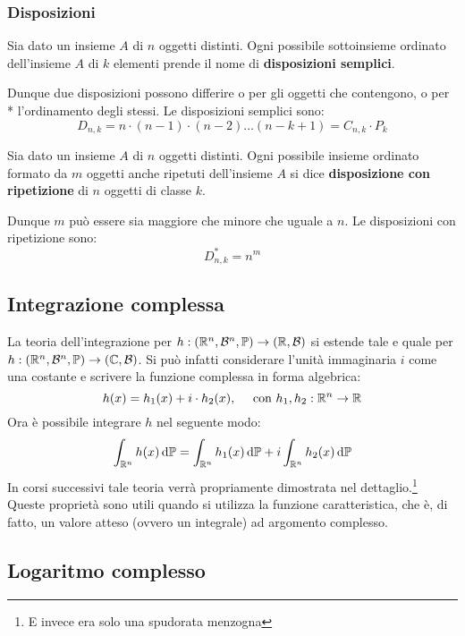 \subsubsection{Disposizioni}

\begin{defn}
	Sia dato un insieme $A$ di $n$ oggetti distinti.
	Ogni possibile sottoinsieme ordinato dell'insieme $A$ di $k$ elementi prende il nome di \textbf{disposizioni semplici}.
\end{defn}

Dunque due disposizioni possono differire o per gli oggetti che contengono, o per \\* l'ordinamento degli stessi. Le  disposizioni semplici sono:
$$D_{n,k}=n	\cdot (n-1) \cdot (n-2) \dots (n-k+1) = C_{n,k} \cdot P_k$$

\begin{defn}
	Sia dato un insieme $A$ di $n$ oggetti distinti.
	Ogni possibile insieme ordinato formato da $m$ oggetti anche ripetuti dell'insieme $A$ si dice \textbf{disposizione con ripetizione} di $n$ oggetti di classe $k$.
\end{defn}

Dunque $m$ può essere sia maggiore che minore che uguale a $n$. Le disposizioni con ripetizione sono:
$$D^*_{n,k}=n^m$$

\subsection{Integrazione complessa}\label{int-complessa}
La teoria dell'integrazione per $h: (\mathbb R^n,\mathcal B^n,\mathbb P) \rightarrow (\mathbb R,\mathcal B)$
si estende tale e quale per $h :(\mathbb R^n,\mathcal B^n,\mathbb P) \rightarrow (\mathbb C,\mathcal B)$.
Si può infatti considerare l'unità immaginaria $i$ come una costante e scrivere la funzione complessa in forma algebrica:
$$h(x)=h_1(x)+i\cdot h_2(x), \quad \text{ con } h_1,h_2:\mathbb R^n \rightarrow \mathbb R$$
Ora è possibile integrare $h$ nel seguente modo:
$$\int_{\mathbb R^n}h(x)\, \mathrm d \mathbb P=\int_{\mathbb R^n}h_1(x)\, \mathrm d \mathbb P + i\int_{\mathbb R^n}h_2(x) \, \mathrm d \mathbb P$$
In corsi successivi tale teoria verrà propriamente dimostrata nel dettaglio.\footnote{E invece era solo una spudorata menzogna} \\
Queste proprietà sono utili quando si utilizza la funzione caratteristica, che è, di fatto, un valore atteso (ovvero un integrale) ad argomento complesso.

\subsection{Logaritmo complesso}  \label{log-complesso}

